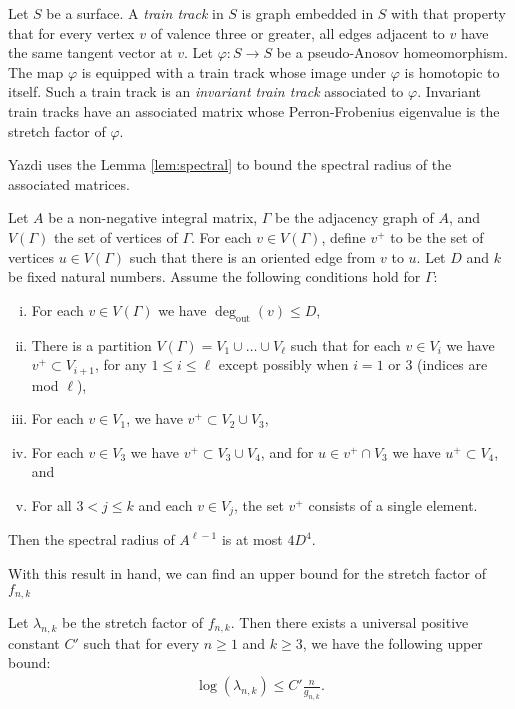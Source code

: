  Let $S$ be a surface.  A \textit{train track} in $S$ is graph embedded in $S$ with that property that for every vertex $v$ of valence three or greater, all edges adjacent to $v$ have the same tangent vector at $v$. Let $\varphi:S\rightarrow S$ be a pseudo-Anosov homeomorphism.  The map $\varphi$ is equipped with a train track whose image under $\varphi$ is homotopic to itself.  Such a train track is an \textit{invariant train track} associated to $\varphi$. Invariant train tracks have an associated matrix whose Perron-Frobenius eigenvalue is the stretch factor of $\varphi$.


Yazdi uses the Lemma \ref{lem:spectral} to bound the spectral radius of the associated matrices.

\begin{lem}
\label{lem:spectral}
Let $A$ be a non-negative integral matrix, $\Gamma$ be the adjacency graph of $A$, and $V(\Gamma)$ the set of
vertices of $\Gamma$. For each $v \in V(\Gamma)$, define $v^+$ to be the set of vertices $u\in V(\Gamma)$ such that there
is an oriented edge from $v$ to $u$. Let $D$ and $k$ be fixed natural numbers. Assume the following conditions
hold for $\Gamma$:
\begin{enumerate}[(i)]
\item For each $v \in V(\Gamma)$ we have $\deg_{\text{out}}(v) \leq D$,
\item There is a partition $V(\Gamma) = V_1 \cup \dots \cup V_\ell$ such that for each $v \in V_i$ we have
  $v^+ \subset V_{i+1}$, for any $1 \leq i \leq \ell$ except possibly when $i = 1$ or 3 (indices are mod $\ell$),
\item For each $v \in V_1$, we have $v^+ \subset V_2 \cup V_3$,
\item For each $v \in V_3$ we have $v^+ \subset V_3 \cup V_4$, and for $u \in v^+ \cap V_3$ we have
  $u^+ \subset V_4$, and
\item For all $3 < j \leq k$ and each $v \in V_j$, the set $v^+$ consists of a single element.
\end{enumerate}

Then the spectral radius of $A^{\ell-1}$ is at most $4D^4$.

\end{lem}
\noindent With this result in hand, we can find an upper bound for the stretch factor of $f_{n,k}$

\begin{lem}\label{lem:upperbound}
  Let $\lambda_{n,k}$ be the stretch factor of $f_{n,k}$. Then there exists a universal positive constant $C'$ such that for every $n \geq 1$ and $k \geq 3$, we have the following upper bound:
  \begin{align*}
   \log(\lambda_{n,k}) \leq C'\frac{n}{g_{n,k}}.
  \end{align*}
\end{lem}

